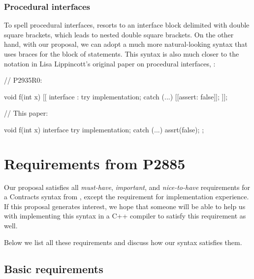 \subsubsection{Procedural interfaces}
\label{subsubsec:comp_interfaces}

To spell procedural interfaces, \cite{P2935R0} resorts to an interface block delimited with double square brackets, which leads to nested double square brackets. On the other hand, with our proposal, we can adopt a much more natural-looking syntax that uses braces for the block of statements. This syntax is also much closer to the notation in Lisa Lippincott's original paper on procedural interfaces, \cite{P0465R0}:
\vspace{5mm}

\begin{minipage}{8cm}
\begin{codeblock}
// P2935R0:

void f(int x)
  [[ interface :
    try {
      implementation;
    } 
    catch (...) {
      [[assert: false]];
    }
  ]];
\end{codeblock}
\end{minipage}
\begin{minipage}{8cm}
\begin{codeblock}
// This paper:

void f(int x)
interface {
  try {
    implementation;
  } 
  catch (...) {
    assrt(false);
  }
};
\end{codeblock}
\end{minipage}

\section{Requirements from P2885}
\label{sec:requirements}

Our proposal satisfies all \emph{must-have}, \emph{important}, and \emph{nice-to-have} requirements for a Contracts syntax from \cite{P2885R2}, except the requirement for implementation experience. If this proposal generates interest, we hope that someone will be able to help us with implementing this syntax in a C++ compiler to satisfy this requirement as well.

Below we list all these requirements and discuss how our syntax satisfies them.

\subsection{Basic requirements}

